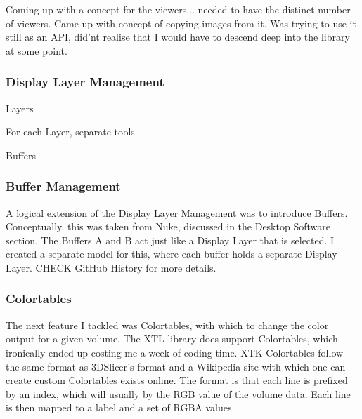 \documentclass[a4paper,11pt,titlepage]{article}
\begin{document}
Coming up with a concept for the viewers... needed to have the distinct number of viewers.
Came up with concept of copying images from it.
Was trying to use it still as an API, did'nt realise that I would have to descend deep into the library at some point.



\subsubsection{Display Layer Management}

Layers

For each Layer, separate tools

Buffers

\subsubsection{Buffer Management}

A logical extension of the Display Layer Management was to introduce Buffers. Conceptually, this was taken from Nuke, discussed in the Desktop Software section. The Buffers A and B act just like a Display Layer that is selected. I created a separate model for this, where each buffer holds a separate Display Layer. 
CHECK GitHub History for more details.

\subsubsection{Colortables}

The next feature I tackled was Colortables, with which to change the color output for a given volume. The XTL library does support Colortables, which ironically ended up costing me a week of coding time. XTK Colortables follow the same format as 3DSlicer's format and a Wikipedia site with which one can create custom Colortables exists online. The format is that each line is prefixed by an index, which will usually by the RGB value of the volume data. Each line is then mapped to a label and a set of RGBA values.
\end{document}

